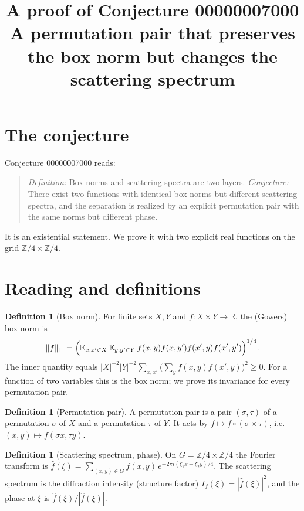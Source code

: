 \documentclass[11pt]{article}
\title{A proof of Conjecture 00000007000\\[2pt]
\large A permutation pair that preserves the box norm but changes the scattering spectrum}
\date{}
\theoremstyle{definition}
\newtheorem{definition}[theorem]{Definition}
\theoremstyle{remark}
\renewcommand{\_}{\oldus\allowbreak}
\begin{document}
\sloppy
\maketitle

\section{The conjecture}

Conjecture 00000007000 reads:

\begin{quote}
\emph{Definition:} Box norms and scattering spectra are two layers. \emph{Conjecture:} There exist
two functions with identical box norms but different scattering spectra, and the separation is
realized by an explicit permutation pair with the same norms but different phase.
\end{quote}

It is an existential statement. We prove it with two explicit real functions on the grid
$\mathbb{Z}/4\times\mathbb{Z}/4$.

\section{Reading and definitions}

\begin{definition}[Box norm]
For finite sets $X,Y$ and $f:X\times Y\to\mathbb{R}$, the (Gowers) box norm is
\[
  \|f\|_{\square}=\Bigl(\mathbb{E}_{x,x'\in X}\,\mathbb{E}_{y,y'\in Y}\,
  f(x,y)f(x,y')f(x',y)f(x',y')\Bigr)^{1/4}.
\]
The inner quantity equals $|X|^{-2}|Y|^{-2}\sum_{x,x'}\bigl(\sum_y f(x,y)f(x',y)\bigr)^2\ge0$.
For a function of two variables this is the box norm; we prove its invariance for every
permutation pair.
\end{definition}

\begin{definition}[Permutation pair]
A permutation pair is a pair $(\sigma,\tau)$ of a permutation $\sigma$ of $X$ and a permutation
$\tau$ of $Y$. It acts by $f\mapsto f\circ(\sigma\times\tau)$, i.e.\ $(x,y)\mapsto
f(\sigma x,\tau y)$.
\end{definition}

\begin{definition}[Scattering spectrum, phase]
On $G=\mathbb{Z}/4\times\mathbb{Z}/4$ the Fourier transform is
$\hat f(\xi)=\sum_{(x,y)\in G}f(x,y)\,e^{-2\pi i(\xi_1x+\xi_2y)/4}$. The scattering spectrum is the
diffraction intensity (structure factor) $I_f(\xi)=|\hat f(\xi)|^2$, and the phase at $\xi$ is
$\hat f(\xi)/|\hat f(\xi)|$.
\end{definition}
\end{document}

